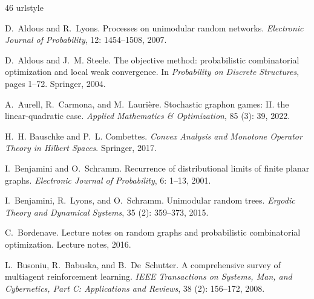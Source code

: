 \documentclass[11pt]{article}
\numberwithin{equation}{section}
\begin{document}
\begin{thebibliography}{46}
\providecommand{\natexlab}[1]{#1}
\providecommand{\url}[1]{\texttt{#1}}
\expandafter\ifx\csname urlstyle\endcsname\relax
  \providecommand{\doi}[1]{doi: #1}\else
  \providecommand{\doi}{doi: \begingroup \urlstyle{rm}\Url}\fi

D.~Aldous and R.~Lyons.
\newblock Processes on unimodular random networks.
\newblock \emph{Electronic Journal of Probability}, 12: 1454--1508,
  2007.

D.~Aldous and J.~M. Steele.
\newblock The objective method: probabilistic combinatorial optimization and
  local weak convergence.
\newblock In \emph{Probability on Discrete Structures}, pages 1--72. Springer,
  2004.

A.~Aurell, R.~Carmona, and M.~Lauri{\`e}re.
\newblock Stochastic graphon games: {II}. the linear-quadratic case.
\newblock \emph{Applied Mathematics \& Optimization}, 85 (3):
  39, 2022.

H.~H. Bauschke and P.~L. Combettes.
\newblock \emph{Convex Analysis and Monotone Operator Theory in Hilbert
  Spaces}.
\newblock Springer, 2017.

I.~Benjamini and O.~Schramm.
\newblock Recurrence of distributional limits of finite planar graphs.
\newblock \emph{Electronic Journal of Probability}, 6: 1--13, 2001.

I.~Benjamini, R.~Lyons, and O.~Schramm.
\newblock Unimodular random trees.
\newblock \emph{Ergodic Theory and Dynamical Systems}, 35
  (2): 359--373, 2015.

C.~Bordenave.
\newblock Lecture notes on random graphs and probabilistic combinatorial
  optimization.
\newblock Lecture notes, 2016.

L.~Busoniu, R.~Babuska, and B.~De~Schutter.
\newblock A comprehensive survey of multiagent reinforcement learning.
\newblock \emph{IEEE Transactions on Systems, Man, and Cybernetics, Part C:
  Applications and Reviews}, 38 (2): 156--172, 2008.


\end{thebibliography}
\end{document}
